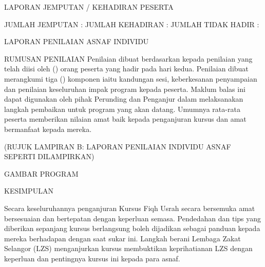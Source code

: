LAPORAN JEMPUTAN / KEHADIRAN PESERTA


JUMLAH JEMPUTAN	: 
JUMLAH KEHADIRAN	: 
JUMLAH TIDAK HADIR	: 

LAPORAN PENILAIAN ASNAF INDIVIDU

RUMUSAN PENILAIAN
Penilaian dibuat berdasarkan kepada penilaian yang telah diisi oleh () orang peserta yang hadir pada hari kedua. Penilaian dibuat merangkumi tiga () komponen iaitu kandungan sesi, keberkesanan penyampaian dan penilaian keseluruhan impak program kepada peserta. Maklum balas ini dapat digunakan oleh pihak Perunding dan Penganjur dalam melaksanakan langkah pembaikan untuk program yang akan datang. Umumnya rata-rata peserta memberikan nilaian amat baik kepada penganjuran kursus dan amat bermanfaat kepada mereka.

(RUJUK LAMPIRAN B: LAPORAN PENILAIAN INDIVIDU ASNAF SEPERTI DILAMPIRKAN)

GAMBAR PROGRAM








KESIMPULAN

Secara keseluruhannya penganjuran Kursus Fiqh Usrah secara bersemuka amat bersesuaian dan bertepatan dengan keperluan semasa. Pendedahan dan tips yang diberikan sepanjang kursus berlangsung boleh dijadikan sebagai panduan kepada mereka berhadapan dengan saat sukar ini. Langkah berani Lembaga Zakat Selangor (LZS) menganjurkan kursus membuktikan keprihatianan LZS dengan keperluan dan pentingnya kursus ini kepada para asnaf.



